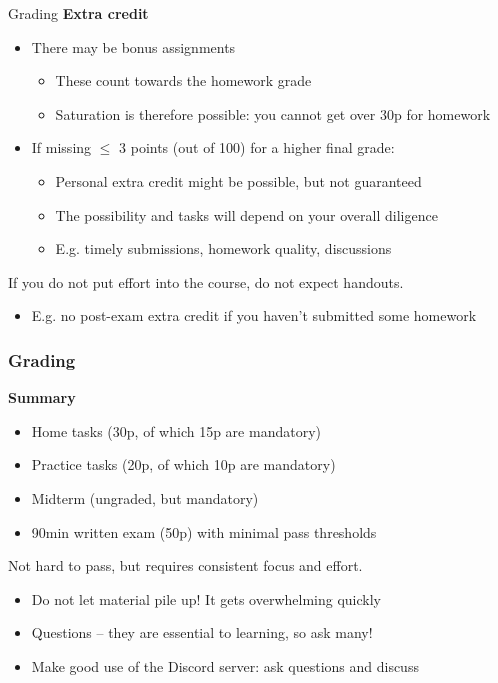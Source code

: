 \begin{frame}{Grading}
  \textbf{Extra credit}
  \pause
  \begin{itemize}
    \item There may be bonus assignments
    \begin{itemize}
      \item These count towards the homework grade
      \item Saturation is therefore possible: you cannot get over 30p for homework
    \end{itemize}
    
    \pause
    \item If missing $\le$ 3 points (out of 100) for a higher final grade:
    \begin{itemize}
      \item Personal extra credit might be possible, but not guaranteed
      \item The possibility and tasks will depend on your overall diligence
      \item E.g. timely submissions, homework quality, discussions
    \end{itemize}
  \end{itemize}

  \vspace{1em}

  \pause
  If you do not put effort into the course, do not expect handouts.
  \begin{itemize}
    \item E.g. no post-exam extra credit if you haven't submitted some homework
  \end{itemize}
\end{frame}

\begin{frame}
  \frametitle{Grading}

  \textbf{Summary}
  \begin{itemize}[<+(1)->]
    \item Home tasks (30p, of which 15p are mandatory)
    \item Practice tasks (20p, of which 10p are mandatory)
    \item Midterm (ungraded, but mandatory)
    \item 90min written exam (50p) with minimal pass thresholds
  \end{itemize}

  \vspace*{1em}

  \pause
  Not hard to pass, but requires consistent focus and effort.
  \begin{itemize}[<+(1)->]
    \item Do not let material pile up!
    It gets overwhelming quickly
    \item Questions -- they are essential to learning, so ask many!
    \item Make good use of the Discord server: ask questions and discuss
  \end{itemize}
\end{frame}

